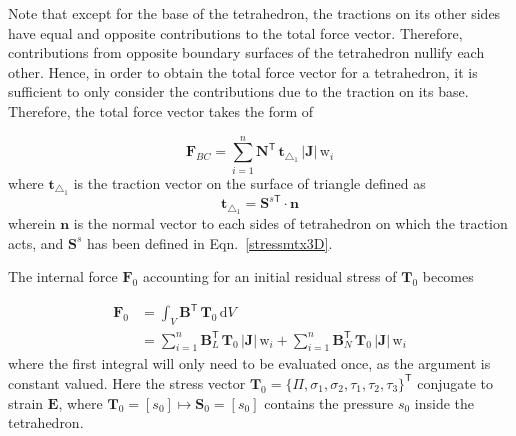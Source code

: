 Note that except for the base of the tetrahedron, the tractions on its other sides have equal and opposite contributions to the total force vector. Therefore, contributions from opposite boundary surfaces of the tetrahedron nullify each other. Hence, in order to obtain the total force vector for a tetrahedron, it is sufficient to only consider the contributions due to the traction on its base. Therefore, the total force vector takes the form of

\begin{equation}
\mathbf{F}_{BC} = \sum_{i=1}^{n} \mathbf{N}^{\mathsf{T}} \, \mathbf{t}_{\triangle_{1}} \,|\mathbf{J}| \, \mathrm{w}_i 
\end{equation}
where $\mathbf{t}_{\triangle_{1}}$ is the traction vector on the surface of triangle defined as
\begin{equation}
	\mathbf{t}_{\triangle_{1}} = \mathbf{S}^{s\mathsf{T}} \cdot \mathbf{n} 
\end{equation}
wherein $ \mathbf{n} $ is the normal vector to each sides of tetrahedron on which the traction acts, and $ \mathbf{S}^s $ has been defined in Eqn.~\eqref{stressmtx3D}.

The internal force $\boldsymbol{F}_0$ accounting for an initial residual stress of $\boldsymbol{T}_0$ becomes

\begin{subequations}
	\begin{align}
		\boldsymbol{F}_0 & = \int_{V} \mathbf{B}^{\mathsf{T}} \,	\boldsymbol{T}_0 \, 
		\mathrm{d} V \\
		& =  \sum_{i=1}^{n} \mathbf{B}_L^{\mathsf{T}} \,	\boldsymbol{T}_0 \, | \mathbf{J} | \, \mathrm{w}_i +  \sum_{i=1}^{n} \mathbf{B}_N^{\mathsf{T}} \,	\boldsymbol{T}_0 \, | \mathbf{J} | \, \mathrm{w}_i
	\end{align}
\end{subequations}
where the first integral will only need to be evaluated once, as the argument is constant valued.
Here the stress vector $\boldsymbol{T}_0 = \{ \Pi, \sigma_1, \sigma_2, \tau_1, \tau_2, \tau_3 \}^{\mathsf{T}}$ conjugate to strain $\boldsymbol{E}$, where $\mathbf{T}_0 = [s_0] \mapsto \mathbf{S}_0 = [s_0]$  contains the pressure $s_0$ inside the tetrahedron.

